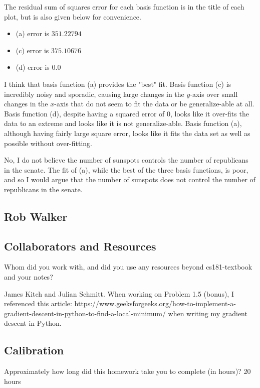 \documentclass[submit]{harvardml}
\begin{document}
The residual sum of squares error for each basis function is in the title of each plot, but is also given below for convenience.
\begin{itemize}
    \item (a) error is $351.22794$
    \item (c) error is $375.10676$
    \item (d) error is $0.0$
\end{itemize}

I think that basis function (a) provides the "best" fit. Basis function (c) is incredibly noisy and sporadic, causing large changes in the $y$-axis over small changes in the $x$-axis that do not seem to fit the data or be generalize-able at all. Basis function (d), despite having a squared error of $0$, looks like it over-fits the data to an extreme and looks like it is not generalize-able. Basis function (a), although having fairly large square error, looks like it fits the data set as well as possible without over-fitting.

No, I do not believe the number of sunspots controls the number of republicans in the senate. The fit of (a), while the best of the three basis functions, is poor, and so I would argue that the number of sunspots does not control the number of republicans in the senate.


\newpage
\subsection*{Rob Walker}

\subsection*{Collaborators and Resources}
Whom did you work with, and did you use any resources beyond cs181-textbook and your notes?

James Kitch and Julian Schmitt. When working on Problem 1.5 (bonus), I referenced this article: https://www.geeksforgeeks.org/how-to-implement-a-gradient-descent-in-python-to-find-a-local-minimum/ when writing my gradient descent in Python.

\subsection*{Calibration}
Approximately how long did this homework take you to complete (in hours)? 
20 hours
\end{document}
